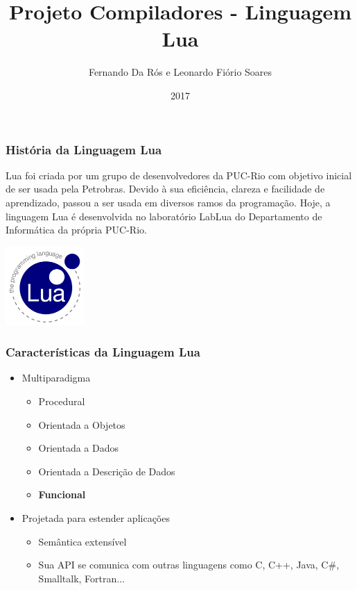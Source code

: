 \documentclass{beamer}
\title{Projeto Compiladores - Linguagem Lua}
\author{Fernando Da Rós e Leonardo Fiório Soares}
\institute[Universidade Federal Fluminense]
\date{2017}
\begin{document}
\begin{frame}
  \titlepage
\end{frame}

\begin{frame}
        \frametitle{História da Linguagem Lua}
        Lua foi criada por um grupo de desenvolvedores da PUC-Rio com objetivo inicial de ser usada pela Petrobras. Devido à sua eficiência, clareza e facilidade de aprendizado, passou a ser usada em diversos ramos da programação. Hoje, a linguagem Lua é desenvolvida no laboratório LabLua do Departamento de Informática da própria PUC-Rio.

        \centering
        \includegraphics[width=3cm]{images/lua.png}
\end{frame}

\begin{frame}
    \frametitle{Características da Linguagem Lua}
    
    \begin{itemize}
    \item Multiparadigma
    
         \begin{itemize}
            \item Procedural
            \item Orientada a Objetos
            \item Orientada a Dados
            \item Orientada a Descrição de Dados            
            \item \textbf{Funcional }
         \end{itemize}
    \end{itemize}
    \begin{itemize}
             \item Projetada para estender aplicações
                \begin{itemize}
                    \item Semântica extensível
                    \item Sua API se comunica com outras linguagens como C, C++, Java, C#, Smalltalk, Fortran...
                \end{itemize}        
     \end{itemize}
\end{frame}
\end{document}
